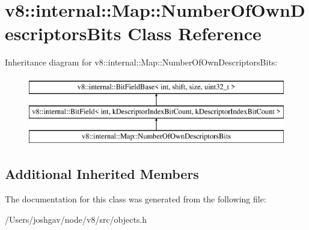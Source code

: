 \hypertarget{classv8_1_1internal_1_1_map_1_1_number_of_own_descriptors_bits}{}\section{v8\+:\+:internal\+:\+:Map\+:\+:Number\+Of\+Own\+Descriptors\+Bits Class Reference}
\label{classv8_1_1internal_1_1_map_1_1_number_of_own_descriptors_bits}
Inheritance diagram for v8\+:\+:internal\+:\+:Map\+:\+:Number\+Of\+Own\+Descriptors\+Bits\+:\begin{figure}[H]
\begin{center}
\leavevmode
\includegraphics[height=3.000000cm]{classv8_1_1internal_1_1_map_1_1_number_of_own_descriptors_bits}
\end{center}
\end{figure}
\subsection*{Additional Inherited Members}


The documentation for this class was generated from the following file\+:\begin{DoxyCompactItemize}
\item 
/\+Users/joshgav/node/v8/src/objects.\+h\end{DoxyCompactItemize}

